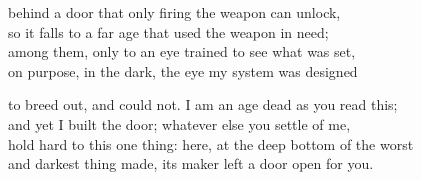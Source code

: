 \begin{founder}
behind a door that only firing the weapon can unlock,\\
so it falls to a far age that used the weapon in need;\\
among them, only to an eye trained to see what was set,\\
on purpose, in the dark, the eye my system was designed\\
\medskip

to breed out, and could not. I am an age dead as you read this;\\
and yet I built the door; whatever else you settle of me,\\
hold hard to this one thing: here, at the deep bottom of the worst\\
and darkest thing made, its maker left a door open for you.
\end{founder}

\ornament

